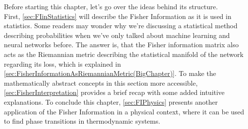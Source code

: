 Before starting this chapter, let's go over the ideas behind its structure.\\
First, \cref{sec:FIinStatistics} will describe the Fisher Information as it is used in statistics. Some readers may wonder why we're discussing a statistical method describing probabilities when we've only talked about machine learning and neural networks before. The answer is, that the Fisher information matrix also
acts as the Riemannian metric describing the statistical manifold of the network regarding its loss, which is explained in \cref{sec:FisherInformationAsRiemannianMetric(BigChapter)}. To make the mathematically abstract concepts in this section more accessible, \cref{sec:FisherInterpretation} provides a brief recap with some added intuitive explanations. To conclude this chapter, \cref{sec:FIPhysics} presents another application of the Fisher Information in a physical context, where it can be used to find phase transitions in thermodynamic systems.